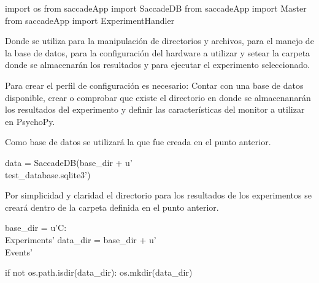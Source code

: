 \documentclass[\main/main.tex]{subfiles}
\begin{document}
\begin{singlespace}\begin{python}
import os
from saccadeApp import SaccadeDB
from saccadeApp import Master
from saccadeApp import ExperimentHandler
\end{python}\end{singlespace}
        
        Donde  se utiliza para la manipulación de directorios y archivos,  para el manejo de la base de datos,  para la configuración del hardware a utilizar y setear la carpeta donde se almacenarán los resultados y  para ejecutar el experimento seleccionado.

        Para crear el perfil de configuración es necesario: Contar con una base de datos disponible, crear o comprobar que existe el directorio en donde se almacenanarán los resultados del experimento y definir las características del monitor a utilizar en PsychoPy. 

        Como base de datos se utilizará la que fue creada en el punto anterior.

\begin{singlespace}\begin{python}
data = SaccadeDB(base_dir + u'\\test_database.sqlite3')
\end{python}\end{singlespace}

        Por simplicidad y claridad el directorio para los resultados de los experimentos se creará dentro de la carpeta definida en el punto anterior.

\begin{singlespace}\begin{python}
base_dir = u'C:\\Experiments'
data_dir = base_dir + u'\\Events'

if not os.path.isdir(data_dir):
    os.mkdir(data_dir) 
\end{python}\end{singlespace}
\end{document}
